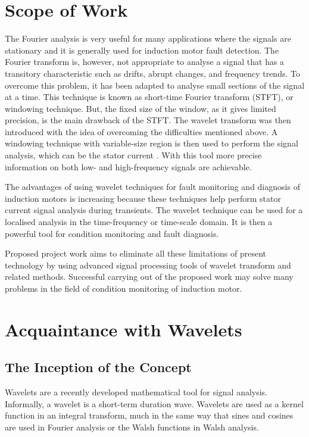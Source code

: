 \documentclass[a4paper,11pt]{article}
\begin{document}
\section{Scope of Work}
The Fourier analysis is very useful for many applications where the signals are stationary and it is generally used for induction motor fault detection. The Fourier transform is, however, not appropriate to analyse a signal that has a transitory characteristic such as drifts, abrupt changes, and frequency trends. To overcome this problem, it has been adapted to analyse small sections of the signal at a time. This technique is known as short-time Fourier transform (STFT), or windowing technique. But, the fixed size of the window, as it gives limited precision, is the main drawback of the STFT. The wavelet transform was then introduced with the idea of overcoming the difficulties mentioned above. A windowing technique with variable-size region is then used to perform the signal analysis, which can be the stator current \cite{00539845}. With this tool more precise information on both low- and high-frequency signals are achievable.

The advantages of using wavelet techniques for fault monitoring and diagnosis of induction motors is increasing because these techniques help perform stator current signal analysis during transients. The wavelet technique can be used for a localised analysis in the time-frequency or time-scale domain. It is then a powerful tool for condition monitoring and fault diagnosis.
     
Proposed project work aims to eliminate all these limitations of present technology by using advanced signal processing tools of wavelet transform and related methods. Successful carrying out of the proposed work may solve many problems in the field of condition monitoring of induction motor.

\section{Acquaintance with Wavelets}
\subsection{The Inception of the Concept}
Wavelets are a recently developed mathematical tool for signal analysis. Informally, a wavelet is a short-term duration wave. Wavelets are used as a kernel function in an integral transform, much in the same way that sines and cosines are used in Fourier analysis or the Walsh functions in Walsh analysis. 
\end{document}
